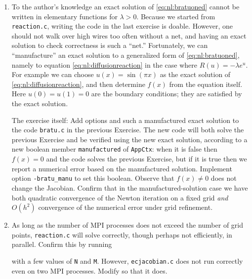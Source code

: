 \begin{enumerate}
\item To the author's knowledge an exact solution of \eqref{eq:nl:bratuoned} cannot be written in elementary functions for $\lambda>0$.  Because we started from \texttt{reaction.c}, writing the code in the last exercise is doable.  However, one should not walk over high wires too often without a net, and having an exact solution to check correctness is such a ``net.''  Fortunately, we can ``manufacture'' \citep{Wesseling2001} an exact solution to a generalized form of \eqref{eq:nl:bratuoned}, namely to equation \eqref{eq:nl:diffusionreaction} in the case where $R(u)=-\lambda e^u$.  For example we can choose $u(x) = \sin(\pi x)$ as the exact solution of \eqref{eq:nl:diffusionreaction}, and then determine $f(x)$ from the equation itself.  Here $u(0)=u(1)=0$ are the boundary conditions; they are satisfied by the exact solution.

The exercise itself: Add options and such a manufactured exact solution to the code \texttt{bratu.c} in the previous Exercise.  The new code will both solve the previous Exercise and be verified using the new exact solution, according to a new boolean member \texttt{manufactured} of \texttt{AppCtx}: when it is false then $f(x)=0$ and the code solves the previous Exercise, but if it is true then we report a numerical error based on the manufactured solution.  Implement option \texttt{-bratu\_manu} to set this boolean.  Observe that $f(x)\ne 0$ does not change the Jacobian.  Confirm that in the manufactured-solution case we have both quadratic convergence of the Newton iteration on a fixed grid \emph{and} $O(h^2)$ convergence of the numerical error under grid refinement.

\item As long as the number of MPI processes does not exceed the number of grid points, \texttt{reaction.c} will solve correctly, though perhaps not efficiently, in parallel.  Confirm this by running
with a few values of \texttt{N} and \texttt{M}.  However, \texttt{ecjacobian.c} does not run correctly even on two MPI processes.  Modify so that it does.

\end{enumerate}
